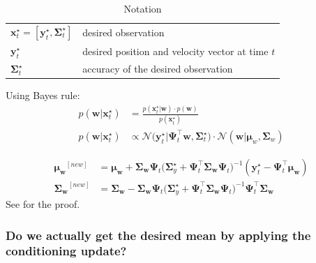 \documentclass{article}
\begin{document}
\begin{table}
  \centering
  \caption{Notation}
  \begin{tabular}{ll}
    \toprule
    $\bm{x}_t^\star = [\bm{y}_t^\star, \bm{\Sigma}^\star_t]$ & desired observation\\
     $\bm{y}^\star_t$ & desired position and velocity vector at time $t$\\
     $\bm{\Sigma}^\star_t$ & accuracy of the desired observation\\
      \bottomrule
  \end{tabular}
\end{table}

Using Bayes rule:
\begin{align}
  p(\bm{w}|\bm{x}_t^\star) &= \frac{p(\bm{x}_t^\star|\bm{w}) \cdot p(\bm{w})}{p(\bm{x}_t^\star)} \\
  p(\bm{w}|\bm{x}_t^\star) &\propto \mathcal{N}\Big( \bm{y}_t^\star | \bm{\Psi}_t^\top\bm{w}, \bm{\Sigma}^\star_t \Big) \cdot \mathcal{N}(\bm{w}|\bm{\mu}_{w}, \bm{\Sigma}_{w})\label{eq:prob-cond-new}
\end{align}

\begin{align}
\bm{\mu_w}^{[new]} &= \bm{\mu_w} + \bm{\Sigma_w}\bm{\Psi}_t \Big(\bm{\Sigma}_y^\star + \bm{\Psi}_t^\top \bm{\Sigma_w}\bm{\Psi}_t \Big)^{-1} (\bm{y}_t^\star - \bm{\Psi}_t^\top \bm{\mu_w})\label{eq:mu-cond-new}\\
\bm{\Sigma_w}^{[new]} &= \bm{\Sigma_w} - \bm{\Sigma_w}\bm{\Psi}_t \Big(\bm{\Sigma}_y^\star +  \bm{\Psi}_t^\top \bm{\Sigma_w}\bm{\Psi}_t \Big)^{-1} \bm{\Psi}_t^\top \bm{\Sigma_w}\label{eq:sigma-cond-new}
\end{align}
See  for the proof.


\subsubsection{Do we actually get the desired mean by applying the conditioning update?}
\end{document}

